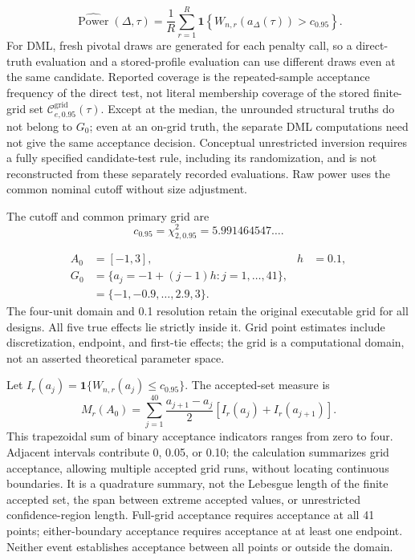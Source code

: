 \begin{equation}
  \widehat{\operatorname{Power}}(\Delta,\tau)
    =\frac{1}{R}\sum_{r=1}^{R}
      \mathbf{1}\!\left\{W_{n,r}\!\left(a_{\Delta}(\tau)\right)>c_{0.95}\right\}.
  \label{eq:performance-power}
\end{equation}
For DML, fresh pivotal draws are generated for each penalty call, so a direct-truth evaluation and a stored-profile evaluation can use different draws even at the same candidate. Reported coverage is the repeated-sample acceptance frequency of the direct test, not literal membership coverage of the stored finite-grid set $\mathcal C^{\mathrm{grid}}_{e,0.95}(\tau)$. Except at the median, the unrounded structural truths do not belong to $G_0$; even at an on-grid truth, the separate DML computations need not give the same acceptance decision. Conceptual unrestricted inversion requires a fully specified candidate-test rule, including its randomization, and is not reconstructed from these separately recorded evaluations. Raw power uses the common nominal cutoff without size adjustment.

The cutoff and common primary grid are
\begin{equation}
  c_{0.95}=\chi^2_{2,0.95}=5.991464547\ldots.
  \label{eq:wn-critical-value}
\end{equation}

\begin{equation}
  \begin{aligned}
    A_0&=[-1,3],
    &h&=0.1,\\
    G_0&=\{a_j=-1+(j-1)h:j=1,\ldots,41\},\\
       &=\{-1,-0.9,\ldots,2.9,3\}.
  \end{aligned}
  \label{eq:primary-grid}
\end{equation}
The four-unit domain and 0.1 resolution retain the original executable grid for all designs. All five true effects lie strictly inside it. Grid point estimates include discretization, endpoint, and first-tie effects; the grid is a computational domain, not an asserted theoretical parameter space.

Let $I_r(a_j)=\mathbf1\{W_{n,r}(a_j)\le c_{0.95}\}$. The accepted-set measure is
\begin{equation}
  M_r(A_0)
  =\sum_{j=1}^{40}\frac{a_{j+1}-a_j}{2}
    \left[I_r(a_j)+I_r(a_{j+1})\right].
  \label{eq:accepted-measure}
\end{equation}
This trapezoidal sum of binary acceptance indicators ranges from zero to four. Adjacent intervals contribute 0, 0.05, or 0.10; the calculation summarizes grid acceptance, allowing multiple accepted grid runs, without locating continuous boundaries. It is a quadrature summary, not the Lebesgue length of the finite accepted set, the span between extreme accepted values, or unrestricted confidence-region length. Full-grid acceptance requires acceptance at all 41 points; either-boundary acceptance requires acceptance at at least one endpoint. Neither event establishes acceptance between all points or outside the domain.

